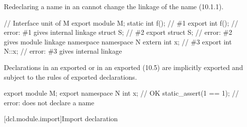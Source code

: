 \begin{std.txt}
  
  \alinea
  \enternote
  Redeclaring a name in an 
  cannot change the linkage of the name (10.1.1).
  \begin{example}
  \begin{codeblock}
    // Interface unit of M
    export module M;
    static int f();             // \#1
    export int f();             // error: \#1 gives internal linkage
    struct S;                   // \#2
    export struct S;            // error: \#2 gives module linkage
    namespace {
      namespace N {
        extern int x;           // \#3
      }
    }
    export int N::x;            // error: \#3 gives internal linkage
  \end{codeblock}
  \end{example}
  \exitnote


  \alinea
  Declarations in an exported  
  or in an exported  (10.5)
  are
  implicitly exported and subject to the rules of exported declarations.
  \begin{example}
    \begin{codeblock}
    export module M;
    export namespace N {
      int x;                    // OK
      static_assert(1 == 1);    // error: does not declare a name
    }
    \end{codeblock}
  \end{example}
\end{std.txt}


[dcl.module.import]{Import declaration}%

